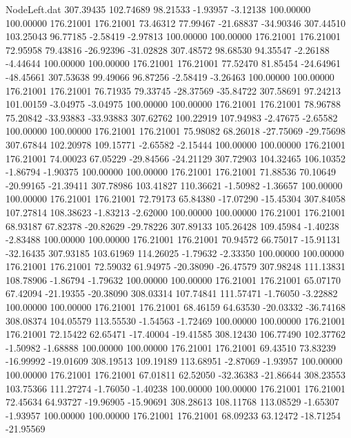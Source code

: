 \begin{filecontents}{NodeLeft.dat}
 307.39435  102.74689   98.21533    -1.93957   -3.12138  100.00000  100.00000  176.21001  176.21001   73.46312   77.99467  -21.68837  -34.90346
 307.44510  103.25043   96.77185    -2.58419   -2.97813  100.00000  100.00000  176.21001  176.21001   72.95958   79.43816  -26.92396  -31.02828
 307.48572   98.68530   94.35547    -2.26188   -4.44644  100.00000  100.00000  176.21001  176.21001   77.52470   81.85454  -24.64961  -48.45661
 307.53638   99.49066   96.87256    -2.58419   -3.26463  100.00000  100.00000  176.21001  176.21001   76.71935   79.33745  -28.37569  -35.84722
 307.58691   97.24213  101.00159    -3.04975   -3.04975  100.00000  100.00000  176.21001  176.21001   78.96788   75.20842  -33.93883  -33.93883
 307.62762  100.22919  107.94983    -2.47675   -2.65582  100.00000  100.00000  176.21001  176.21001   75.98082   68.26018  -27.75069  -29.75698
 307.67844  102.20978  109.15771    -2.65582   -2.15444  100.00000  100.00000  176.21001  176.21001   74.00023   67.05229  -29.84566  -24.21129
 307.72903  104.32465  106.10352    -1.86794   -1.90375  100.00000  100.00000  176.21001  176.21001   71.88536   70.10649  -20.99165  -21.39411
 307.78986  103.41827  110.36621    -1.50982   -1.36657  100.00000  100.00000  176.21001  176.21001   72.79173   65.84380  -17.07290  -15.45304
 307.84058  107.27814  108.38623    -1.83213   -2.62000  100.00000  100.00000  176.21001  176.21001   68.93187   67.82378  -20.82629  -29.78226
 307.89133  105.26428  109.45984    -1.40238   -2.83488  100.00000  100.00000  176.21001  176.21001   70.94572   66.75017  -15.91131  -32.16435
 307.93185  103.61969  114.26025    -1.79632   -2.33350  100.00000  100.00000  176.21001  176.21001   72.59032   61.94975  -20.38090  -26.47579
 307.98248  111.13831  108.78906    -1.86794   -1.79632  100.00000  100.00000  176.21001  176.21001   65.07170   67.42094  -21.19355  -20.38090
 308.03314  107.74841  111.57471    -1.76050   -3.22882  100.00000  100.00000  176.21001  176.21001   68.46159   64.63530  -20.03332  -36.74168
 308.08374  104.05579  113.55530    -1.54563   -1.72469  100.00000  100.00000  176.21001  176.21001   72.15422   62.65471  -17.40004  -19.41585
 308.12430  106.77490  102.37762    -1.50982   -1.68888  100.00000  100.00000  176.21001  176.21001   69.43510   73.83239  -16.99992  -19.01609
 308.19513  109.19189  113.68951    -2.87069   -1.93957  100.00000  100.00000  176.21001  176.21001   67.01811   62.52050  -32.36383  -21.86644
 308.23553  103.75366  111.27274    -1.76050   -1.40238  100.00000  100.00000  176.21001  176.21001   72.45634   64.93727  -19.96905  -15.90691
 308.28613  108.11768  113.08529    -1.65307   -1.93957  100.00000  100.00000  176.21001  176.21001   68.09233   63.12472  -18.71254  -21.95569

\end{filecontents}
